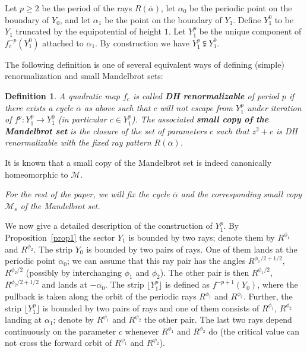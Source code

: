 \documentclass[12pt,a4paper]{amsart}
\newtheorem{definition}[theorem]{Definition}
\newcommand{\MM}{\mathcal M}
\newcommand{\ovl}{\overline}
\begin{document}
Let $p\ge 2$ be the period of the rays $R(\ovl\alpha)$, let
$\alpha_0$ be the periodic point on the boundary of $Y_0$, and let
$\alpha_1$ be the point on the boundary of $Y_1$. Define $Y^0_1$ to
be $Y_1$ truncated by the equipotential of height $1$. Let $Y^p_1$
be the unique component of $f_c^{-p}(Y^0_1)$ attached to $\alpha_1$.
By
  construction we have $Y^p_1\subsetneqq Y^0_1$.




The following definition is one of several equivalent ways of
defining (simple) renormalization and small Mandelbrot sets:

\begin{definition}
\label{defMM} A quadratic map $f_c$ is called \textbf{DH
renormalizable} of period $p$ if there exists a cycle $\ovl\alpha$
as above such that $c$ will not escape from $Y^p_1$ under iteration
of $f^p:Y^p_1 \rightarrow Y^0_1$ (in particular $c\in Y^p_1$). The
associated \textbf{small copy of the Mandelbrot set} is the closure
of the set of parameters $c$ such that $z^2+c$ is DH renormalizable
with the fixed ray pattern $R(\ovl\alpha)$.
\end{definition}


It is known \cite{DH} that a small copy of the Mandelbrot set is
indeed canonically homeomorphic to $\MM$.

\textit{For the rest of the paper, we will fix the cycle
$\ovl{\alpha}$ and the corresponding small copy $\MM_s$ of the
Mandelbrot set.}


   We now give a detailed description of the construction of $Y^p_1$.
   By Proposition~\ref{prop1} the sector $Y_1$ is bounded by two
   rays;
   denote them by $R^{\phi_1}$ and $R^{\phi_2}$.
   The strip $Y_0$ is bounded by two pairs of rays. One of them lands
at the periodic point $\alpha_0$; we can assume that this ray pair
has the angles $R^{\phi_1/2+1/2}$, $R^{\phi_2/2}$ (possibly by
interchanging $\phi_1$ and $\phi_2$). The other pair is then
$R^{\phi_1/2}$, $R^{\phi_2/2+1/2}$ and lands at $-\alpha_0$.
   The strip $\lfloor Y^p_1 \rfloor$ is defined as $f^{-p+1}(Y_0)$,
   where the pullback is taken along the
   orbit of the periodic rays $R^{\phi_1}$ and $R^{\phi_2}$.
   Further, the strip $\lfloor Y^p_1 \rfloor$ is bounded by two pairs of rays
   and one of them consists of $R^{\phi_1}$, $R^{\phi_2}$ landing at
   $\alpha_1$; denote by $R^{\psi_1}$ and $R^{\psi_2}$ the other
   pair. The last two rays depend continuously on the parameter $c$ whenever
   $R^{\phi_1}$ and $R^{\phi_2}$ do (the critical value can not cross
the forward orbit of $R^{\psi_1}$ and
   $R^{\psi_2}$).
\end{document}
